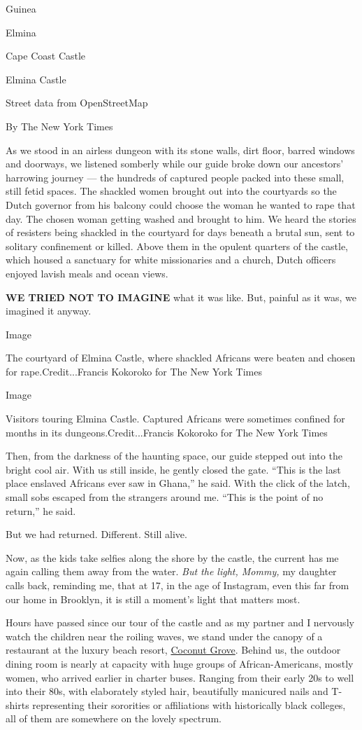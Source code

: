 Guinea

Elmina

Cape Coast Castle

Elmina Castle

Street data from OpenStreetMap

By The New York Times

As we stood in an airless dungeon with its stone walls, dirt floor,
barred windows and doorways, we listened somberly while our guide broke
down our ancestors' harrowing journey --- the hundreds of captured
people packed into these small, still fetid spaces. The shackled women
brought out into the courtyards so the Dutch governor from his balcony
could choose the woman he wanted to rape that day. The chosen woman
getting washed and brought to him. We heard the stories of resisters
being shackled in the courtyard for days beneath a brutal sun, sent to
solitary confinement or killed. Above them in the opulent quarters of
the castle, which housed a sanctuary for white missionaries and a
church, Dutch officers enjoyed lavish meals and ocean views.

\textbf{WE TRIED NOT TO IMAGINE} what it was like. But, painful as it
was, we imagined it anyway.

Image

The courtyard of Elmina Castle, where shackled Africans were beaten and
chosen for rape.Credit...Francis Kokoroko for The New York Times

Image

Visitors touring Elmina Castle. Captured Africans were sometimes
confined for months in its dungeons.Credit...Francis Kokoroko for The
New York Times

Then, from the darkness of the haunting space, our guide stepped out
into the bright cool air. With us still inside, he gently closed the
gate. ``This is the last place enslaved Africans ever saw in Ghana,'' he
said. With the click of the latch, small sobs escaped from the strangers
around me. ``This is the point of no return,'' he said.

But we had returned. Different. Still alive.

Now, as the kids take selfies along the shore by the castle, the current
has me again calling them away from the water. \emph{But the light,
Mommy,} my daughter calls back, reminding me, that at 17, in the age of
Instagram, even this far from our home in Brooklyn, it is still a
moment's light that matters most.

Hours have passed since our tour of the castle and as my partner and I
nervously watch the children near the roiling waves, we stand under the
canopy of a restaurant at the luxury beach resort,
\href{https://coconutgrovehotelsghana.com/}{Coconut Grove}. Behind us,
the outdoor dining room is nearly at capacity with huge groups of
African-Americans, mostly women, who arrived earlier in charter buses.
Ranging from their early 20s to well into their 80s, with elaborately
styled hair, beautifully manicured nails and T-shirts representing their
sororities or affiliations with historically black colleges, all of them
are somewhere on the lovely spectrum.

